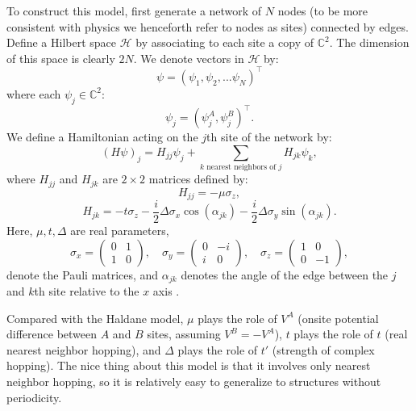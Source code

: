 \documentclass[a4paper]{article}
\begin{document}
To construct this model, first generate a network of $N$ nodes (to be more consistent with physics we henceforth refer to nodes as sites) connected by edges. Define a Hilbert space $\mathcal{H}$ by associating to each site a copy of $\mathbb{C}^2$. The dimension of this space is clearly $2 N$. We denote vectors in $\mathcal{H}$ by:
\begin{equation}
	\psi = \left( \psi_1, \psi_2, ... \psi_N \right)^\top
\end{equation}
where each $\psi_j \in \mathbb{C}^2$:
\begin{equation}
	\psi_j = \left( \psi_j^A , \psi_j^B \right)^\top.
\end{equation}
We define a Hamiltonian acting on the $j$th site of the network by:
\begin{equation}
	( H \psi )_j = H_{jj} \psi_j + \sum_{ k \text{ nearest neighbors of } j } H_{jk} \psi_k,
\end{equation}
where $H_{jj}$ and $H_{jk}$ are $2 \times 2$ matrices defined by:
\begin{equation}
	H_{jj} = - \mu \sigma_z,
\end{equation}
\begin{equation}
	H_{jk} = - t \sigma_z - \frac{ i }{ 2 } \Delta \sigma_x \cos( \alpha_{jk} ) - \frac{ i }{ 2 } \Delta \sigma_y \sin( \alpha_{jk} ).
\end{equation}
Here, $\mu, t, \Delta$ are real parameters,
\begin{equation}
	\sigma_x = \begin{pmatrix} 0 & 1 \\ 1 & 0 \end{pmatrix}, \quad \sigma_y = \begin{pmatrix} 0 & - i \\ i & 0 \end{pmatrix}, \quad \sigma_z = \begin{pmatrix} 1 & 0 \\ 0 & -1 \end{pmatrix},
\end{equation}
denote the Pauli matrices, and $\alpha_{jk}$ denotes the angle of the edge between the $j$ and $k$th site relative to the $x$ axis \cite{Loring}.%

Compared with the Haldane model, $\mu$ plays the role of $V^A$ (onsite potential difference between $A$ and $B$ sites, assuming $V^B = - V^A$), $t$ plays the role of $t$ (real nearest neighbor hopping), and $\Delta$ plays the role of $t'$ (strength of complex hopping). The nice thing about this model is that it involves only nearest neighbor hopping, so it is relatively easy to generalize to structures without periodicity.
\end{document}
